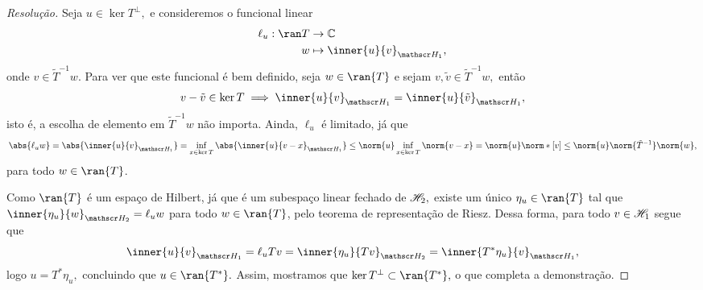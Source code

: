 \begin{proof}[Resolução]
  Seja \(u \in \ker{T}^\perp,\) e consideremos o funcional linear
  \begin{align*}
    \ell_u : \ran T &\to \mathbb{C}\\
                  w &\mapsto \inner{u}{v}_{\hilbert_1},
  \end{align*}
  onde \(v \in \tilde{T}^{-1}w.\)
  Para ver que este funcional é bem definido, seja \(w \in \ran{T}\) e sejam \(v, \tilde{v} \in \tilde{T}^{-1}w,\) então
  \begin{equation*}
    v - \tilde{v} \in \ker{T} \implies \inner{u}{v}_{\hilbert_1} = \inner{u}{\tilde{v}}_{\hilbert_1},
  \end{equation*}
  isto é, a escolha de elemento em \(\tilde{T}^{-1}w\) não importa. Ainda, \(\ell_u\) é limitado, já que
  \begin{equation*}
    \abs{\ell_uw} = \abs{\inner{u}{v}_{\hilbert_1}} = \inf_{x \in \ker{T}}{\abs{\inner{u}{v - x}_{\hilbert_1}}} \leq \norm{u}\inf_{x \in \ker{T}}{\norm{v - x}} = \norm{u} \norm*{[v]} \leq \norm{u} \norm{\tilde{T}^{-1}} \norm{w},
  \end{equation*}
  para todo \(w \in \ran{T}\).

  Como \(\ran{T}\) é um espaço de Hilbert, já que é um subespaço linear fechado de \(\mathscr{H}_2,\) existe um único \(\eta_u \in \ran{T}\) tal que \(\inner{\eta_u}{w}_{\hilbert_2} = \ell_uw\) para todo \(w\in \ran{T}\), pelo teorema de representação de Riesz. Dessa forma, para todo \(v \in \mathscr{H}_1\) segue que
  \begin{equation*}
    \inner{u}{v}_{\hilbert_1} = \ell_uTv = \inner{\eta_u}{Tv}_{\hilbert_2} = \inner{T^*\eta_u}{v}_{\hilbert_1},
  \end{equation*}
  logo \(u = T^*\eta_u,\) concluindo que \(u \in \ran{T^*}.\) Assim, mostramos que \(\ker{T}^\perp \subset \ran{T^*},\) o que completa a demonstração.
\end{proof}
